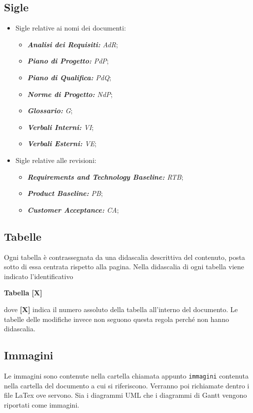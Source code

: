 \subsection{Sigle}
\label{sigle}
\begin{itemize}
    \item Sigle relative ai nomi dei documenti:
    \begin{itemize}
        \item \textit{\textbf{Analisi dei Requisiti:} AdR};
        \item \textit{\textbf{Piano di Progetto:} PdP};
        \item \textit{\textbf{Piano di Qualifica:} PdQ};
        \item \textit{\textbf{Norme di Progetto:} NdP};
        \item \textit{\textbf{Glossario:} G};
        \item \textit{\textbf{Verbali Interni:} VI};
        \item \textit{\textbf{Verbali Esterni:} VE};
    \end{itemize}
    \item Sigle relative alle revisioni:
    \begin{itemize}
        \item \textit{\textbf{Requirements and Technology Baseline:} RTB};
        \item \textit{\textbf{Product Baseline:} PB};
        \item \textit{\textbf{Customer Acceptance:} CA};
    \end{itemize}
\end{itemize}
\subsection{Tabelle}
Ogni tabella è contrassegnata da una didascalia descrittiva del contenuto, posta sotto di essa centrata rispetto alla pagina.  Nella didascalia di ogni tabella viene indicato l’identificativo
\begin{center}
    \textbf{Tabella [X]}
\end{center}
dove \textbf{[X]} indica il numero assoluto della tabella all’interno del documento. Le tabelle delle modifiche invece non seguono questa regola perché non hanno didascalia.
\subsection{Immagini}
Le immagini sono contenute nella cartella chiamata appunto \texttt{immagini} contenuta nella cartella del documento a cui si riferiscono. Verranno poi richiamate dentro i file LaTex ove servono. Sia i diagrammi UML che i diagrammi di Gantt vengono riportati come immagini.
